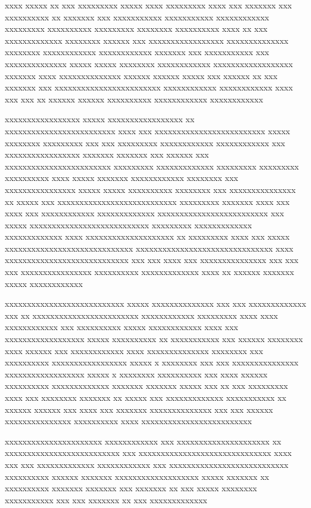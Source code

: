 \begin{introduction}
xxxx xxxxx xx xxx xxxxxxxxx xxxxx xxxx xxxxxxxxx xxxx xxx xxxxxxx xxx xxxxxxxxxx xx xxxxxxx xxx xxxxxxxxxxx xxxxxxxxxxx xxxxxxxxxxxx xxxxxxxxx xxxxxxxxxx xxxxxxxxx xxxxxxxx xxxxxxxxxx xxxx xx xxx xxxxxxxxxxxxx xxxxxxxx xxxxxx xxx xxxxxxxxxxxxxxxxx xxxxxxxxxxxxxx xxxxxxxx xxxxxxxxxxxx xxxxxxxxxxxx xxxxxxx xxx xxxxxxxxxxx xxx xxxxxxxxxxxxxx xxxxx xxxxx xxxxxxxx xxxxxxxxxxxx xxxxxxxxxxxxxxxxxx xxxxxxx xxxx xxxxxxxxxxxxxx xxxxxx xxxxxx xxxxx xxx xxxxxx xx xxx xxxxxxx xxx xxxxxxxxxxxxxxxxxxxxxxxx xxxxxxxxxxxx xxxxxxxxxxxx xxxx xxx xxx xx xxxxxx xxxxxx xxxxxxxxxx xxxxxxxxxxxx xxxxxxxxxxxx

xxxxxxxxxxxxxxxxx xxxxx xxxxxxxxxxxxxxxxx
xx xxxxxxxxxxxxxxxxxxxxxxxxx xxxx xxx xxxxxxxxxxxxxxxxxxxxxxxxx xxxxx xxxxxxxx xxxxxxxxx xxx xxx xxxxxxxxx xxxxxxxxxxxx xxxxxxxxxxxx xxx xxxxxxxxxxxxxxxxx xxxxxxx xxxxxxx xxx xxxxxx xxx xxxxxxxxxxxxxxxxxxxxxxxx xxxxxxxxx xxxxxxxxxxxxx xxxxxxxxx xxxxxxxxx xxxxxxxxxx xxxx xxxxx xxxxxxx xxxxxxxxxxxx xxxxxxxx xxx xxxxxxxxxxxxxxxx xxxxx xxxxx xxxxxxxxxx xxxxxxxx xxx xxxxxxxxxxxxxxx xx xxxxx xxx xxxxxxxxxxxxxxxxxxxxxxxxxxx xxxxxxxxx xxxxxxx xxxx xxx xxxx xxx xxxxxxxxxxxx xxxxxxxxxxxxx xxxxxxxxxxxxxxxxxxxxxxxxx xxx xxxxx xxxxxxxxxxxxxxxxxxxxxxxxxxx xxxxxxxxx xxxxxxxxxxxxx xxxxxxxxxxxxx xxxx xxxxxxxxxxxxxxxxxxxx xx xxxxxxxxx xxxx xxx xxxxx xxxxxxxxxxxxxxxxxxxxxxxxxxxxx xxxxxxxxxxxxxxxxxxxxxxxxxxxxxxx xxxx xxxxxxxxxxxxxxxxxxxxxxxxxxxx xxx xxx xxxx xxx xxxxxxxxxxxxxxx xxx xxx xxx xxxxxxxxxxxxxxxx xxxxxxxxxx xxxxxxxxxxxxx xxxx xx xxxxxx xxxxxxx xxxxx xxxxxxxxxxxx

xxxxxxxxxxxxxxxxxxxxxxxxxxx xxxxx xxxxxxxxxxxxxx xxx xxx xxxxxxxxxxxxx
xxx xx xxxxxxxxxxxxxxxxxxxxxxxx xxxxxxxxxxxx xxxxxxxxx xxxx xxxx xxxxxxxxxxxx xxx xxxxxxxxxx xxxxx xxxxxxxxxxxx xxxx xxx xxxxxxxxxxxxxxxxxx xxxxx xxxxxxxxxx xx xxxxxxxxxxx xxx xxxxxx xxxxxxxx xxxx xxxxxx xxx xxxxxxxxxxxx xxxx xxxxxxxxxxxxxx xxxxxxxx xxx xxxxxxxxxx xxxxxxxxxxxxxxxxx xxxxx x xxxxxxxx xxx xxx xxxxxxxxxxxxxxx xxxxxxxxxxxxxxxxxx xxxxx x xxxxxxxx xxxxxxxxxx xxx xxxx xxxxxx xxxxxxxxxx xxxxxxxxxxxxx xxxxxxx xxxxxxx xxxxx xxx xx xxx xxxxxxxxx xxxx xxx xxxxxxxx xxxxxxx xx xxxxx xxx xxxxxxxxxxxxx xxxxxxxxxxx xx xxxxxx xxxxxx xxx xxxx xxx xxxxxxx xxxxxxxxxxxxxx xxx xxx xxxxxx xxxxxxxxxxxxxxx xxxxxxxxxx xxxx xxxxxxxxxxxxxxxxxxxxxxxxx

xxxxxxxxxxxxxxxxxxxxxx xxxxxxxxxxxx xxx xxxxxxxxxxxxxxxxxxxxx
xx xxxxxxxxxxxxxxxxxxxxxxxxxx xxx xxxxxxxxxxxxxxxxxxxxxxxxxxxxxx xxxx xxx xxx xxxxxxxxxxxxx xxxxxxxxxxxx xxx xxxxxxxxxxxxxxxxxxxxxxxxxxx xxxxxxxxxx xxxxxx xxxxxxx xxxxxxxxxxxxxxxxxxx xxxxx xxxxxxx xx xxxxxxxxxx xxxxxxx xxxxxxx xxx xxxxxxx xx xxx xxxxx xxxxxxxx xxxxxxxxxxx xxx xxx xxxxxxx xx xxx xxxxxxxxxxxxx


\end{introduction}
